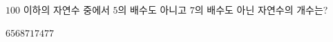 $100$ 이하의 자연수 중에서 $5$의 배수도 아니고 $7$의 배수도 아닌 자연수의 개수는?
\begin{choices32}{$65$}{$68$}{$71$}{$74$}{$77$}\end{choices32}
